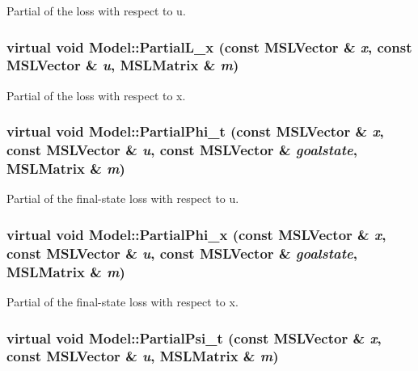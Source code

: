Partial of the loss with respect to u.

\subsubsection{\setlength{\rightskip}{0pt plus 5cm}virtual void Model::Partial\-L\_\-x (const {\bf MSLVector} \& {\em x}, const {\bf MSLVector} \& {\em u}, {\bf MSLMatrix} \& {\em m})\hspace{0.3cm}{\tt  [inline, virtual]}}\label{classModel_a13}


Partial of the loss with respect to x.

\subsubsection{\setlength{\rightskip}{0pt plus 5cm}virtual void Model::Partial\-Phi\_\-t (const {\bf MSLVector} \& {\em x}, const {\bf MSLVector} \& {\em u}, const {\bf MSLVector} \& {\em goalstate}, {\bf MSLMatrix} \& {\em m})\hspace{0.3cm}{\tt  [inline, virtual]}}\label{classModel_a17}


Partial of the final-state loss with respect to u.

\subsubsection{\setlength{\rightskip}{0pt plus 5cm}virtual void Model::Partial\-Phi\_\-x (const {\bf MSLVector} \& {\em x}, const {\bf MSLVector} \& {\em u}, const {\bf MSLVector} \& {\em goalstate}, {\bf MSLMatrix} \& {\em m})\hspace{0.3cm}{\tt  [inline, virtual]}}\label{classModel_a16}


Partial of the final-state loss with respect to x.

\subsubsection{\setlength{\rightskip}{0pt plus 5cm}virtual void Model::Partial\-Psi\_\-t (const {\bf MSLVector} \& {\em x}, const {\bf MSLVector} \& {\em u}, {\bf MSLMatrix} \& {\em m})\hspace{0.3cm}{\tt  [inline, virtual]}}\label{classModel_a20}


